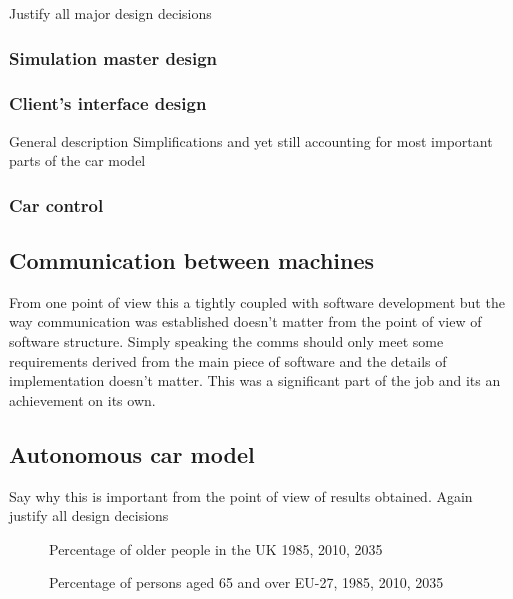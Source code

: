 \documentclass[12pt]{article} %
\begin{document}
Justify all major design decisions

\subsubsection{Simulation master design}

\subsubsection{Client's interface design}

General description Simplifications and yet still accounting for most important parts of
the car model

\subsubsection{Car control}

\subsection{Communication between machines}

From one point of view this a tightly coupled with software development but the way
communication was established doesn’t matter from the point of view of software structure.
Simply speaking the comms should only meet some requirements derived from
the main piece of software and the details of implementation doesn’t matter. This was
a significant part of the job and its an achievement on its own.

\subsection{Autonomous car model}

Say why this is important from the point of view of results obtained. Again justify all
design decisions





\begin{figure}[H] %
\caption{Percentage of older people in the UK 1985, 2010, 2035 \citep*{UK_aging}}
\label{fig:senior_65}
\end{figure}

\begin{figure}[H]
  \begin{center}
  \end{center}
 \caption{Percentage of persons aged 65 and over EU-27, 1985, 2010, 2035 \citep*{UK_aging}}
\end{figure} 
\end{document}
